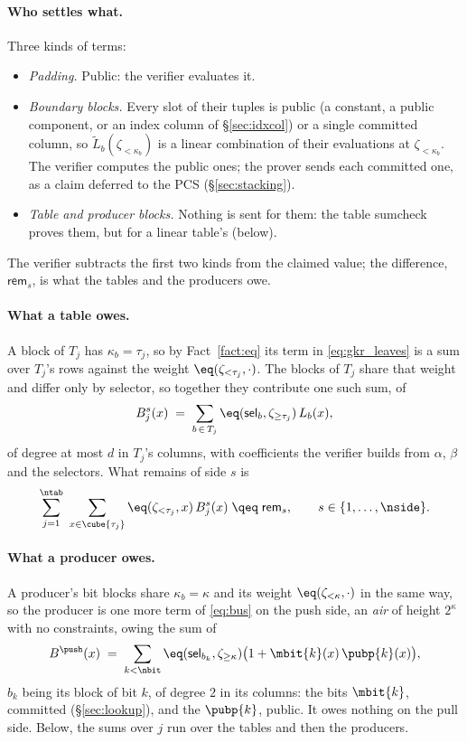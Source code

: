 \paragraph{Who settles what.} Three kinds of terms:
\begin{itemize}[itemsep=1pt,topsep=3pt]
\item \emph{Padding.} Public: the verifier evaluates it.
\item \emph{Boundary blocks.} Every slot of their tuples is public (a constant, a public component, or an index column of \S\ref{sec:idxcol}) or a single committed column, so $\widetilde L_b(\zeta_{<\kappa_b})$ is a linear combination of their evaluations at $\zeta_{<\kappa_b}$. The verifier computes the public ones; the prover sends each committed one, as a claim deferred to the PCS (\S\ref{sec:stacking}).
\item \emph{Table and producer blocks.} Nothing is sent for them: the table sumcheck proves them, but for a linear table's (below).
\end{itemize}
The verifier subtracts the first two kinds from the claimed value; the difference, $\mathsf{rem}_{s}$, is what the tables and the producers owe.

\paragraph{What a table owes.} A block of $T_j$ has $\kappa_b=\tau_j$, so by Fact~\ref{fact:eq} its term in \eqref{eq:gkr_leaves} is a sum over $T_j$'s rows against the weight $\eq(\zeta_{<\tau_j},\cdot)$. The blocks of $T_j$ share that weight and differ only by selector, so together they contribute one such sum, of
\begin{equation}\label{eq:bus_poly}
  B^{s}_j(x)\;=\;\sum_{b\,\in\,T_j}\eq(\mathsf{sel}_b,\zeta_{\ge\tau_j})\,L_b(x),
\end{equation}
of degree at most $d$ in $T_j$'s columns, with coefficients the verifier builds from $\alpha$, $\beta$ and the selectors. What remains of side $s$ is
\begin{equation}\label{eq:bus}
  \sum_{j=1}^{\ntab}\ \sum_{x\in\cube{\tau_j}}\eq(\zeta_{<\tau_j},x)\,B^{s}_j(x)\;\qeq\;\mathsf{rem}_{s},
  \qquad s\in\{1,\dots,\nside\}.
\end{equation}

\paragraph{What a producer owes.} A producer's bit blocks share $\kappa_b=\kappa$ and its weight $\eq(\zeta_{<\kappa},\cdot)$ in the same way, so the producer is one more term of \eqref{eq:bus} on the push side, an \emph{air} of height $2^{\kappa}$ with no constraints, owing the sum of
\[
  B^{\push}(x)\;=\;\sum_{k<\nbit}\eq(\mathsf{sel}_{b_k},\zeta_{\ge\kappa})\bigl(1+\mbit{k}(x)\,\pubp{k}(x)\bigr),
\]
$b_k$ being its block of bit $k$, of degree $2$ in its columns: the bits $\mbit{k}$, committed (\S\ref{sec:lookup}), and the $\pubp{k}$, public. It owes nothing on the pull side. Below, the sums over $j$ run over the tables and then the producers.

